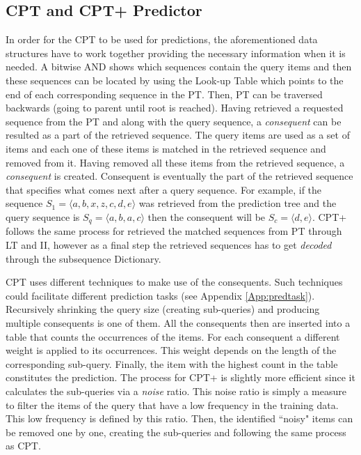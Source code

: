 \subsection{CPT and CPT+ Predictor}\label{predictors}
In order for the CPT to be used for predictions, the aforementioned data structures have to work together providing the necessary information when it is needed. A bitwise AND shows which sequences contain the query items and then these sequences can be located by using the Look-up Table which points to the end of each corresponding sequence in the PT. Then, PT can be traversed backwards (going to parent until root is reached). Having retrieved a requested sequence from the PT and along with the query sequence, a \emph{consequent} can be resulted as a part of the retrieved sequence. The query items are used as a set of items and each one of these items is matched in the retrieved sequence and removed from it. Having removed all these items from the retrieved sequence, a \emph{consequent} is created. Consequent is eventually the part of the retrieved sequence that specifies what comes next after a query sequence. For example, if the sequence \(S_1=\langle a, b, x, z, c, d, e\rangle\) was retrieved from the prediction tree and the query sequence is \(S_q=\langle a, b, a, c\rangle\) then the consequent will be \(S_c=\langle d, e\rangle\). CPT+ follows the same process for retrieved the matched sequences from PT through LT and II, however as a final step the retrieved sequences has to get \emph{decoded} through the subsequence Dictionary.
\par CPT uses different techniques \cite{gueniche_fournier-viger_tseng_2013} to make use of the consequents. Such techniques could facilitate different prediction tasks (see Appendix \ref{App:predtask}). Recursively shrinking the query size (creating sub-queries) and producing multiple consequents is one of them. All the consequents then are inserted into a table that counts the occurrences of the items. For each consequent a different weight is applied to its occurrences. This weight depends on the length of the corresponding sub-query. Finally, the item with the highest count in the table constitutes the prediction. The process for CPT+ is slightly more efficient since it calculates the sub-queries via a \emph{noise} ratio. This noise ratio is simply a measure to filter the items of the query that have a low frequency in the training data. This low frequency is defined by this ratio. Then, the identified ``noisy" items can be removed one by one, creating the sub-queries and following the same process as CPT.

